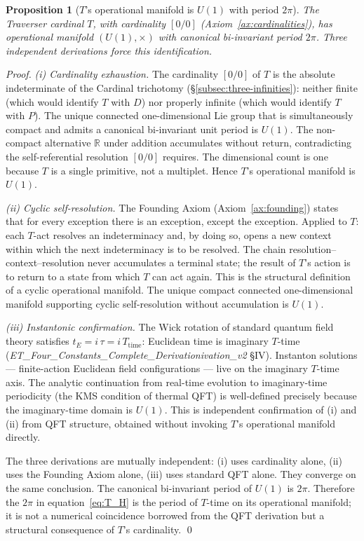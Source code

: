 \documentclass[11pt,a4paper]{article}
\newtheorem{proposition}[theorem]{Proposition}
\theoremstyle{definition}
\theoremstyle{remark}
\begin{document}
\begin{proposition}[$T$'s operational manifold is $U(1)$ with period $2\pi$]\label{prop:U1-period}
The Traverser cardinal $T$, with cardinality $[0/0]$ (Axiom~\ref{ax:cardinalities}), has operational manifold $(U(1),\times)$ with canonical bi-invariant period $2\pi$. Three independent derivations force this identification.
\end{proposition}

\begin{proof}
\emph{(i) Cardinality exhaustion.} The cardinality $[0/0]$ of $T$ is the absolute indeterminate of the Cardinal trichotomy (\S\ref{subsec:three-infinities}): neither finite (which would identify $T$ with $D$) nor properly infinite (which would identify $T$ with $P$). The unique connected one-dimensional Lie group that is simultaneously compact and admits a canonical bi-invariant unit period is $U(1)$. The non-compact alternative $\mathbb{R}$ under addition accumulates without return, contradicting the self-referential resolution $[0/0]$ requires. The dimensional count is one because $T$ is a single primitive, not a multiplet. Hence $T$'s operational manifold is $U(1)$.

\emph{(ii) Cyclic self-resolution.} The Founding Axiom (Axiom~\ref{ax:founding}) states that for every exception there is an exception, except the exception. Applied to $T$: each $T$-act resolves an indeterminacy and, by doing so, opens a new context within which the next indeterminacy is to be resolved. The chain resolution--context--resolution never accumulates a terminal state; the result of $T$'s action is to return to a state from which $T$ can act again. This is the structural definition of a cyclic operational manifold. The unique compact connected one-dimensional manifold supporting cyclic self-resolution without accumulation is $U(1)$.

\emph{(iii) Instantonic confirmation.} The Wick rotation of standard quantum field theory satisfies $t_{E} = i\,\tau = i\,T_{\text{time}}$: Euclidean time is imaginary $T$-time (\textit{ET\_\allowbreak Four\_\allowbreak Constants\_\allowbreak Complete\_\allowbreak Derivationivation\_v2} \S IV). Instanton solutions --- finite-action Euclidean field configurations --- live on the imaginary $T$-time axis. The analytic continuation from real-time evolution to imaginary-time periodicity (the KMS condition of thermal QFT) is well-defined precisely because the imaginary-time domain is $U(1)$. This is independent confirmation of (i) and (ii) from QFT structure, obtained without invoking $T$'s operational manifold directly.

The three derivations are mutually independent: (i) uses cardinality alone, (ii) uses the Founding Axiom alone, (iii) uses standard QFT alone. They converge on the same conclusion. The canonical bi-invariant period of $U(1)$ is $2\pi$. Therefore the $2\pi$ in equation~\eqref{eq:T_H} is the period of $T$-time on its operational manifold; it is not a numerical coincidence borrowed from the QFT derivation but a structural consequence of $T$'s cardinality. \qed
\end{proof}
\end{document}
